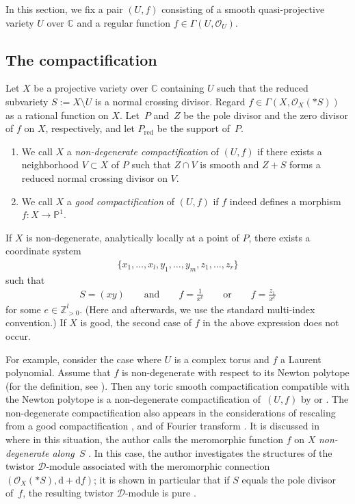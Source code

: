 \documentclass[pdftex]{sigma}
\newcommand{\CC}{\mathbb{C}}
\newcommand{\PP}{\mathbb{P}}
\newcommand{\ZZ}{\mathbb{Z}}
\newcommand{\sD}{\mathscr{D}}
\newcommand{\sO}{\mathscr{O}}
\newcommand{\de}{\mathrm{d}}
\newcommand{\cpt}{compactification}
\newcommand{\red}[1]{{#1}_{\mathrm{red}}}
\begin{document}
In this section, we fix a pair $(U,f)$ consisting of a smooth quasi-projective variety $U$ over $\CC$ and a regular function $f\in\Gamma(U,\sO_U)$.

\subsection{The \cpt}
Let $X$ be a projective variety over $\CC$ containing $U$ such that the reduced subvariety $S := X\setminus U$ is a normal crossing divisor. Regard $f\in\Gamma(X,\sO_X(*S))$ as a rational function on $X$. Let~$P$ and~$Z$ be the pole divisor and the zero divisor of $f$ on $X$, respectively, and let $\red{P}$ be the support of~$P$.

\begin{definition*}\quad\begin{enumerate}\itemsep=0pt
\item[(i)] We call $X$ a \textit{non-degenerate {\cpt}} of $(U,f)$ if there exists a neighborhood $V \subset X$ of $P$ such that $Z\cap V$ is smooth and $Z+S$ forms a reduced normal crossing divisor on $V$.

\item[(ii)] We call $X$ a \textit{good {\cpt}} of $(U,f)$ if $f$ indeed defines a morphism $f\colon X \to \PP^1$.
\end{enumerate}
\end{definition*}

If $X$ is non-degenerate, analytically locally at a point of $P$, there exists a coordinate system
\begin{gather*} \{x_1,\dots,x_l, y_1,\dots,y_m,z_1,\dots,z_r\} \end{gather*}
such that
\begin{gather}\label{eq:non-deg-local}
S = (xy) \qquad\text{and}\qquad f= \frac{1}{x^e} \qquad\text{or}\qquad f = \frac{z_1}{x^e}
\end{gather}
for some $e \in \ZZ_{>0}^l$. (Here and afterwards, we use the standard multi-index convention.) If $X$ is good, the second case of $f$ in the above expression does not occur.

For example, consider the case where $U$ is a complex torus and $f$ a Laurent polynomial. Assume that $f$ is non-degenerate with respect to its Newton polytope (for the definition, see \cite[Section~4]{Y}). Then any toric smooth {\cpt} compatible with the Newton polytope is a non-degenerate {\cpt} of~$(U,f)$ by \cite[Proposition~4.3]{Y} or \cite[Lemma~6.6]{M_GKZ}. The non-degenerate {\cpt} also appears in the considerations of rescaling
from a good {\cpt} \cite[Section~7.3]{SY}, and of Fourier transform \cite[Section~4]{S}. It is discussed in~\cite{M_GKZ} where in this situation, the author calls the meromorphic function $f$ on $X$ \textit{non-degenerate along~$S$} \cite[Definition~2.6]{M_GKZ}. In this case, the author investigates the structures of the twistor $\sD$-module associated with the meromorphic connection $(\sO_X(*S), \de +\de f)$; it is shown in particular that if $S$ equals the pole divisor of~$f$, the resulting twistor $\sD$-module is pure \cite[Lemma~2.10 and Corollary~3.12]{M_GKZ}.
\end{document}

